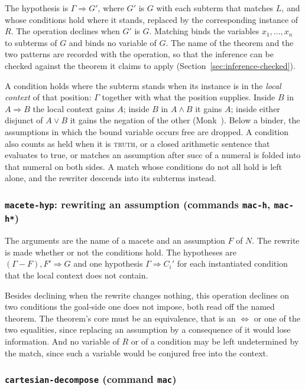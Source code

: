 The hypothesis is $\Gamma \Longrightarrow G'$, where $G'$ is $G$ with each
subterm that matches $L$, and whose conditions hold where it stands,
replaced by the corresponding instance of $R$.  The operation declines
when $G'$ is $G$.  Matching binds the variables $x_1, \ldots, x_n$ to
subterms of $G$ and binds no variable of $G$.  The name of the theorem
and the two patterns are recorded with the operation, so that the
inference can be checked against the theorem it claims to apply
(Section~\ref{sec:inference-checked}).

A condition holds where the subterm stands when its instance is in the
\emph{local context} of that position: $\Gamma$ together with what the
position supplies.  Inside $B$ in $A \Rightarrow B$ the local context
gains $A$; inside $B$ in $A \wedge B$ it gains $A$; inside either
disjunct of $A \vee B$ it gains the negation of the other
(Monk~\cite{Monk1988}).  Below a binder, the assumptions in which the
bound variable occurs free are dropped.  A condition also counts as held
when it is \textsc{truth}, or a closed arithmetic sentence that evaluates
to true, or matches an assumption after $\mathrm{succ}$ of a numeral is
folded into that numeral on both sides.  A match whose conditions do not
all hold is left alone, and the rewriter descends into its subterms
instead.

\subsubsection*{\texttt{macete-hyp}: rewriting an assumption
  (commands \texttt{mac-h}, \texttt{mac-h*})}

The arguments are the name of a macete and an assumption $F$ of $N$.
The rewrite is made whether or not the conditions hold.  The hypotheses
are $(\Gamma - F), F' \Longrightarrow G$ and one hypothesis
$\Gamma \Longrightarrow C_i'$ for each instantiated condition that the
local context does not contain.

Besides declining when the rewrite changes nothing, this operation
declines on two conditions the goal-side one does not impose, both read
off the named theorem.  The theorem's core must be an equivalence, that is an
$\Leftrightarrow$ or one of the two equalities, since replacing an
assumption by a consequence of it would lose information.
And no variable of $R$ or of a condition may be left undetermined by the
match, since such a variable would be conjured free into the context.

\subsubsection*{\texttt{cartesian-decompose} (command \texttt{mac})}

